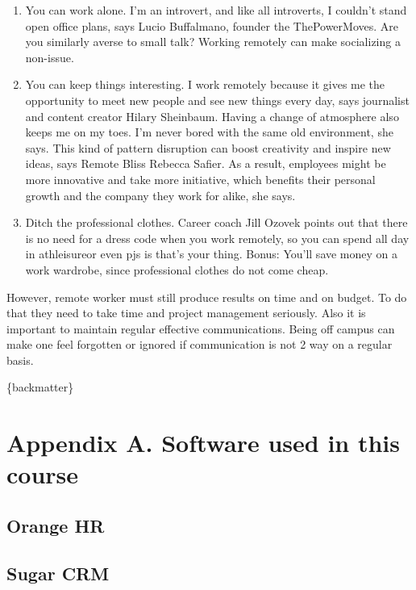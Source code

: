 \documentclass[]{book}
\begin{document}
\begin{enumerate}
\item
  You can work alone. I'm an introvert, and like all introverts, I couldn't stand open office plans, says Lucio Buffalmano, founder the ThePowerMoves. Are you similarly averse to small talk? Working remotely can make socializing a non-issue.
\item
  You can keep things interesting. I work remotely because it gives me the opportunity to meet new people and see new things every day, says journalist and content creator Hilary Sheinbaum. Having a change of atmosphere also keeps me on my toes. I'm never bored with the same old environment, she says. This kind of pattern disruption can boost creativity and inspire new ideas, says Remote Bliss Rebecca Safier. As a result, employees might be more innovative and take more initiative, which benefits their personal growth and the company they work for alike, she says.
\item
  Ditch the professional clothes.
  Career coach Jill Ozovek points out that there is no need for a dress code when you work remotely, so you can spend all day in athleisureor even pjs is that's your thing. Bonus: You'll save money on a work wardrobe, since professional clothes do not come cheap.
\end{enumerate}

However, remote worker must still produce results on time and on budget. To do that they need to take time and project management seriously. Also it is important to maintain regular effective communications. Being off campus can make one feel forgotten or ignored if communication is not 2 way on a regular basis.

\{backmatter\}

\hypertarget{appendix-appendix}{%
\appendix}


\hypertarget{appendix-a.-software-used-in-this-course}{%
\chapter{Appendix A. Software used in this course}\label{appendix-a.-software-used-in-this-course}}

\hypertarget{orange-hr}{%
\section{Orange HR}\label{orange-hr}}

\hypertarget{sugar-crm}{%
\section{Sugar CRM}\label{sugar-crm}}
\end{document}
